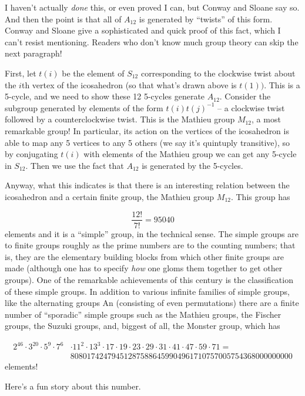 I haven't actually \emph{done} this, or even proved I can, but Conway and Sloane say so. And then the point is that all of $A_{12}$ is generated by ``twists'' of this form. Conway and Sloane give a sophisticated and quick proof of this fact, which I can't resist mentioning. Readers who don't know much group theory can skip the next paragraph!

First, let $t(i)$ be the element of $S_{12}$ corresponding to the clockwise twist about the $i$th vertex of the icosahedron (so that what's drawn above is $t(1))$. This is a 5-cycle, and we need to show these 12 5-cycles generate $A_{12}$. Consider the subgroup generated by elements of the form $t(i)t(j)^{-1}$ -- a clockwise twist followed by a counterclockwise twist. This is the Mathieu group $M_{12}$, a most remarkable group! In particular, its action on the vertices of the icosahedron is able to map any 5 vertices to any 5 others (we say it's quintuply transitive), so by conjugating $t(i)$ with elements of the Mathieu group we can get any 5-cycle in $S_{12}$. Then we use the fact that $A_{12}$ is generated by the 5-cycles.

Anyway, what this indicates is that there is an interesting relation between the icosahedron and a certain finite group, the Mathieu group $M_{12}$. This group has

\[ \frac{12!}{7!} = 95040 \]
elements and it is a ``simple'' group, in the technical sense. The simple groups are to finite groups roughly as the prime numbers are to the counting numbers; that is, they are the elementary building blocks from which other finite groups are made (although one has to specify \emph{how} one gloms them together to get other groups). One of the remarkable achievements of this century is the classification of these simple groups. In addition to various infinite families of simple groups, like the alternating groups An (consisting of even permutations) there are a finite number of ``sporadic'' simple groups such as the Mathieu groups, the Fischer groups, the Suzuki groups, and, biggest of all, the Monster group, which has

\begin{align*} 2^{46} \cdot 3^{20} \cdot 5^9 \cdot 7^6 & \cdot 11^2 \cdot 13^3 \cdot 17 \cdot 19 \cdot 23 \cdot 29 \cdot 31 \cdot 41 \cdot 47 \cdot 59 \cdot 71 = \\
& 808017424794512875886459904961710757005754368000000000 \end{align*}
elements!

Here's a fun story about this number.

